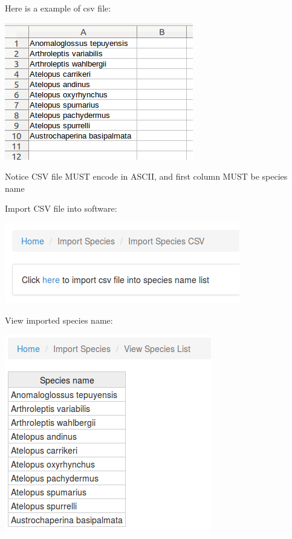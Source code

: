 \documentclass{beamer}
\begin{document}
\begin{frame}
	Here is a example of csv file:
	\begin{center}
		\includegraphics[scale=0.5]{image/csv_example.png}
	\end{center}
	\begin{block}{Notice}
		CSV file MUST encode in ASCII, and first column MUST be species name
	\end{block}
\end{frame}
\begin{frame}
	Import CSV file into software:
	\begin{center}
		\includegraphics[scale=0.5]{image/import_csv.png}
	\end{center}
\end{frame}
\begin{frame}
	View imported species name:
	\begin{center}
		\includegraphics[scale=0.5]{image/view_species_name.png}
	\end{center}
\end{frame}
\end{document}
